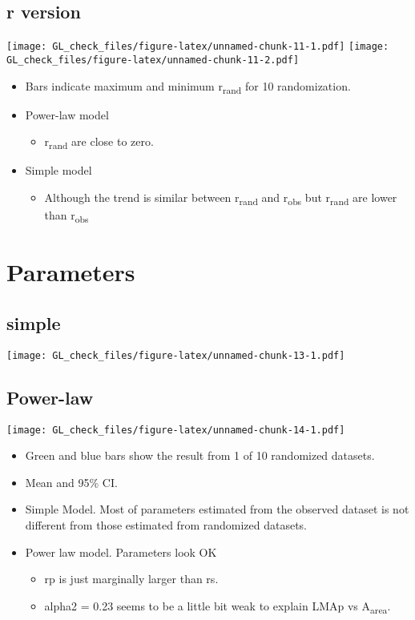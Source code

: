 \documentclass[12pt,]{article}
\providecommand{\tightlist}{%
  \setlength{\itemsep}{0pt}\setlength{\parskip}{0pt}}
\theoremstyle{definition}
\theoremstyle{definition}
\theoremstyle{remark}
\begin{document}
\subsection{r version}\label{r-version}

\texttt{[image: GL\_check\_files/figure-latex/unnamed-chunk-11-1.pdf]}
\texttt{[image: GL\_check\_files/figure-latex/unnamed-chunk-11-2.pdf]}

\begin{itemize}
\tightlist
\item
  Bars indicate maximum and minimum r\textsubscript{rand} for 10
  randomization.
\item
  Power-law model

  \begin{itemize}
  \tightlist
  \item
    r\textsubscript{rand} are close to zero.
  \end{itemize}
\item
  Simple model

  \begin{itemize}
  \tightlist
  \item
    Although the trend is similar between r\textsubscript{rand} and
    r\textsubscript{obs} but r\textsubscript{rand} are lower than
    r\textsubscript{obs}
  \end{itemize}
\end{itemize}

\section{Parameters}\label{parameters}

\subsection{simple}\label{simple}

\texttt{[image: GL\_check\_files/figure-latex/unnamed-chunk-13-1.pdf]}

\subsection{Power-law}\label{power-law}

\texttt{[image: GL\_check\_files/figure-latex/unnamed-chunk-14-1.pdf]}

\begin{itemize}
\tightlist
\item
  Green and blue bars show the result from 1 of 10 randomized datasets.
\item
  Mean and 95\% CI.
\item
  Simple Model. Most of parameters estimated from the observed dataset
  is not different from those estimated from randomized datasets.
\item
  Power law model. Parameters look OK

  \begin{itemize}
  \tightlist
  \item
    rp is just marginally larger than rs.
  \item
    alpha2 = 0.23 seems to be a little bit weak to explain LMAp vs
    A\textsubscript{area}.
  \end{itemize}
\end{itemize}
\end{document}

